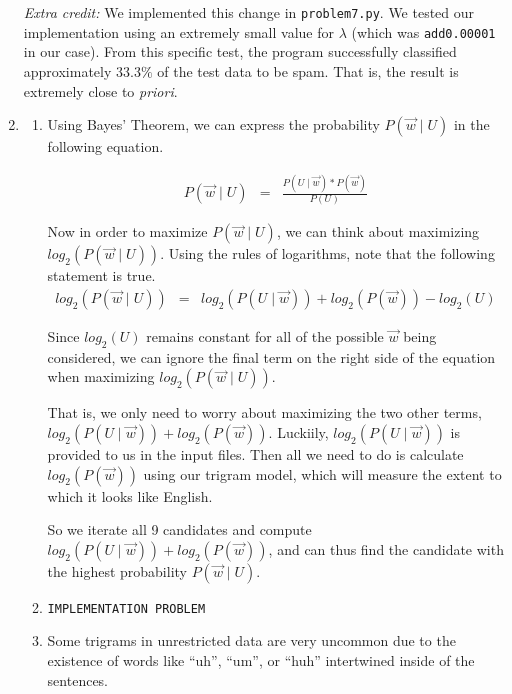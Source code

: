 \documentclass[11pt]{article}
\begin{document}
\begin{enumerate}
\begin{enumerate}[label=\roman*.]
	\end{enumerate}

	\textit{Extra credit:} We implemented this change in \texttt{problem7.py}. We tested our implementation using an extremely small value for $\lambda$ (which was \texttt{add0.00001} in our case). From this specific test, the program successfully classified approximately $33.3\%$ of the test data to be spam. That is, the result is extremely close to \textit{priori}.

\item %
	\begin{enumerate}[label=(\alph*)]
	\item
		Using Bayes’ Theorem, we can express the probability $P(\vec{w} \mid U)$ in the following equation.

		\begin{eqnarray*}
			P(\vec{w} \mid U) &=& \frac{P(U \mid \vec{w}) * P(\vec{w})}{P(U)}
		\end{eqnarray*}

		Now in order to maximize $P(\vec{w} \mid U)$, we can think about maximizing $log_2(P(\vec{w} \mid U))$. Using the rules of logarithms, note that the following statement is true.
		\begin{eqnarray*}
			log_2(P(\vec{w} \mid U)) &=& log_2(P(U \mid \vec{w})) + log_2(P(\vec{w})) - log_2(U)
		\end{eqnarray*}

		Since $log_2(U)$ remains constant for all of the possible $\vec{w}$ being considered, we can ignore the final term on the right side of the equation when maximizing $log_2(P(\vec{w} \mid U))$. \vspace{4pt}

		That is, we only need to worry about maximizing the two other terms, $log_2(P(U \mid \vec{w})) + log_2(P(\vec{w}))$. Luckiily, $log_2(P(U \mid \vec{w}))$ is provided to us in the input files. Then all we need to do is calculate $log_2(P(\vec{w}))$ using our trigram model, which will measure the extent to which it looks like English. \vspace{4pt}

		So we iterate all 9 candidates and compute $log_2(P(U \mid \vec{w})) + log_2(P(\vec{w}))$, and can thus find the candidate with the highest probability $P(\vec{w} \mid U)$.
	\item
		\texttt{IMPLEMENTATION PROBLEM}
	\item
		Some trigrams in unrestricted data are very uncommon due to the existence of words like ``uh'', ``um'', or ``huh'' intertwined inside of the sentences. \vspace{4pt}


\end{enumerate}
\end{enumerate}
\end{document}
